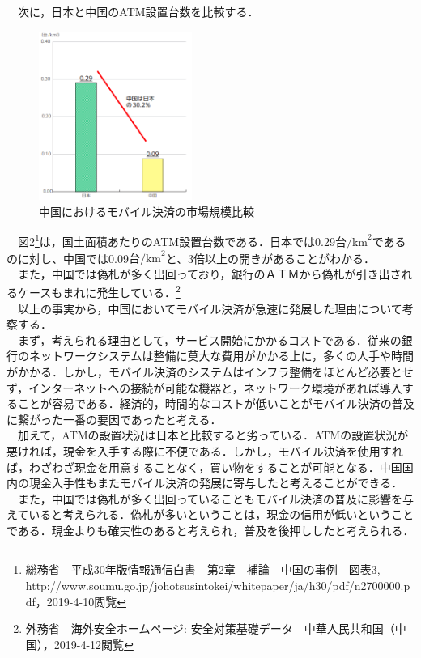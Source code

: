 \newpage

　次に，日本と中国のATM設置台数を比較する．\\
\begin{figure}[H]
  \centering
  \includegraphics[width=5cm]{./imgs/2.png}
  \caption{中国におけるモバイル決済の市場規模比較}
\end{figure}
　図2\footnote{総務省　平成30年版情報通信白書　第2章　補論　中国の事例　図表3,\\http://www.soumu.go.jp/johotsusintokei/whitepaper/ja/h30/pdf/n2700000.pdf，2019-4-10閲覧}は，国土面積あたりのATM設置台数である．日本では0.29$\mbox{台/km}^2$であるのに対し、中国では0.09$\mbox{台/km}^2$と、3倍以上の開きがあることがわかる．\\

　また，中国では偽札が多く出回っており，銀行のＡＴＭから偽札が引き出されるケースもまれに発生している．\footnote{外務省　海外安全ホームページ: 安全対策基礎データ　中華人民共和国（中国），2019-4-12閲覧}\\

　以上の事実から，中国においてモバイル決済が急速に発展した理由について考察する．\\
　まず，考えられる理由として，サービス開始にかかるコストである．従来の銀行のネットワークシステムは整備に莫大な費用がかかる上に，多くの人手や時間がかかる．しかし，モバイル決済のシステムはインフラ整備をほとんど必要とせず，インターネットへの接続が可能な機器と，ネットワーク環境があれば導入することが容易である．経済的，時間的なコストが低いことがモバイル決済の普及に繋がった一番の要因であったと考える．\\
　加えて，ATMの設置状況は日本と比較すると劣っている．ATMの設置状況が悪ければ，現金を入手する際に不便である．しかし，モバイル決済を使用すれば，わざわざ現金を用意することなく，買い物をすることが可能となる．中国国内の現金入手性もまたモバイル決済の発展に寄与したと考えることができる．\\
　また，中国では偽札が多く出回っていることもモバイル決済の普及に影響を与えていると考えられる．偽札が多いということは，現金の信用が低いということである．現金よりも確実性のあると考えられ，普及を後押ししたと考えられる．


